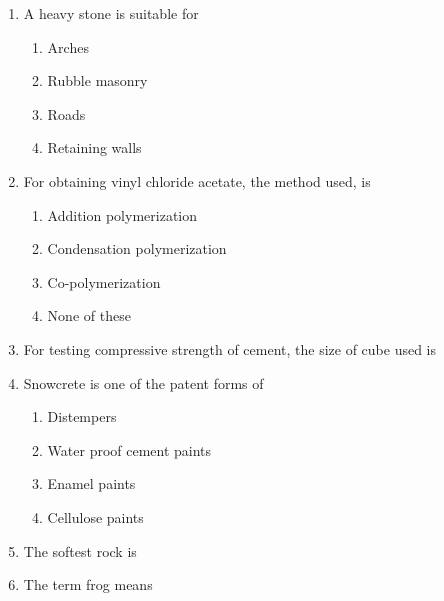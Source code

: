 \documentclass[11pt,a4paper]{article}
\begin{document}
\begin{enumerate}
\begin{enumerate*}[itemjoin=\qquad, label=\Alph*.]
\end{enumerate*}
\item{A heavy stone is suitable for}
\begin{enumerate}[label=\Alph*.]
\item{Arches}
\item{Rubble masonry}
\item{Roads}
\item{Retaining walls}
\end{enumerate}
\item{For obtaining vinyl chloride acetate, the method used, is}
\begin{enumerate}[label=\Alph*.]
\item{Addition polymerization}
\item{Condensation polymerization}
\item{Co-polymerization}
\item{None of these}
\end{enumerate}
\item{For testing compressive strength of cement, the size of cube used is}
\\\begin{enumerate*}[itemjoin=\qquad, label=\Alph*.]
\item{50 mm}
\item{70.6 mm}
\item{100 mm}
\item{150 mm}
\end{enumerate*}
\item{Snowcrete is one of the patent forms of}
\begin{enumerate}[label=\Alph*.]
\item{Distempers}
\item{Water proof cement paints}
\item{Enamel paints}
\item{Cellulose paints}
\end{enumerate}
\item{The softest rock is}
\\
\item{The term frog means}
\begin{enumerate}[label=\Alph*.]

\end{enumerate}
\end{enumerate}
\end{document}
